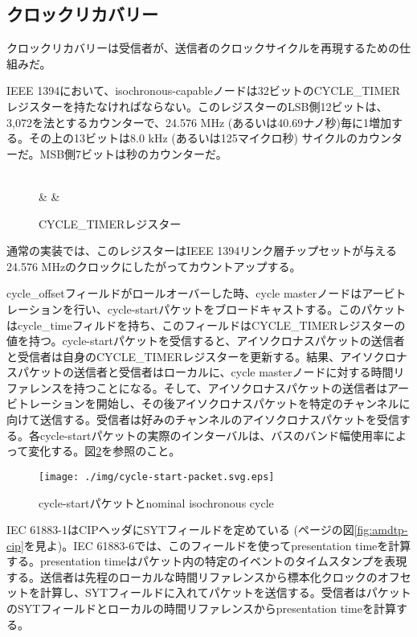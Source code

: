\documentclass[onecolumn]{jarticle}
\begin{document}
\subsection{クロックリカバリー}
\label{sec:clock-recovery}

クロックリカバリーは受信者が、送信者のクロックサイクルを再現するための仕組みだ。

IEEE 1394\cite{ieee1394-2}において、isochronous-capableノードは32ビットのCYCLE\_TIMERレジスターを持たなければならない。このレジスターのLSB側12ビットは、3,072を法とするカウンターで、24.576 MHz (あるいは40.69ナノ秒)毎に1増加する。その上の13ビットは8.0 kHz (あるいは125マイクロ秒) サイクルのカウンターだ。MSB側7ビットは秒のカウンターだ。


\begin{figure}[htbp]
\centering
\begin{bytefield}[bitwidth=auto,endianness=big]{32}
	 \\
	 &
	 &
\end{bytefield}
\caption{{CYCLE\_TIMERレジスター}}
\label{cycle_timer}
\end{figure}

通常の実装では、このレジスターはIEEE 1394リンク層チップセットが与える24.576 MHzのクロックにしたがってカウントアップする。

cycle\_offsetフィールドがロールオーバーした時、cycle masterノードはアービトレーションを行い、cycle-startパケットをブロードキャストする。このパケットはcycle\_timeフィルドを持ち、このフィールドはCYCLE\_TIMERレジスターの値を持つ。cycle-startパケットを受信すると、アイソクロナスパケットの送信者と受信者は自身のCYCLE\_TIMERレジスターを更新する。結果、アイソクロナスパケットの送信者と受信者はローカルに、cycle masterノードに対する時間リファレンスを持つことになる。そして、アイソクロナスパケットの送信者はアービトレーションを開始し、その後アイソクロナスパケットを特定のチャンネルに向けて送信する。受信者は好みのチャンネルのアイソクロナスパケットを受信する。各cycle-startパケットの実際のインターバルは、バスのバンド幅使用率によって変化する。図\ref{fig:cycle-start}を参照のこと。


\begin{figure}[htbp]
\centering
\texttt{[image: ./img/cycle-start-packet.svg.eps]}
\caption{{cycle-startパケットとnominal isochronous cycle}}
\label{fig:cycle-start}
\end{figure}

IEC 61883-1はCIPヘッダにSYTフィールドを定めている (\pageref{fig:amdtp-cip}ページの図\ref{fig:amdtp-cip}を見よ)。IEC 61883-6では、このフィールドを使ってpresentation timeを計算する。presentation timeはパケット内の特定のイベントのタイムスタンプを表現する。送信者は先程のローカルな時間リファレンスから標本化クロックのオフセットを計算し、SYTフィールドに入れてパケットを送信する。受信者はパケットのSYTフィールドとローカルの時間リファレンスからpresentation timeを計算する。
\end{document}
